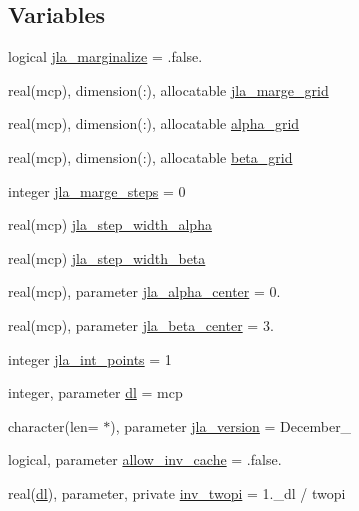 \subsection*{Variables}
\begin{DoxyCompactItemize}
\item 
logical \mbox{\hyperlink{namespacejla_af9daaf320a7953866d9f29f7f569fbe4}{jla\+\_\+marginalize}} = .false.
\item 
real(mcp), dimension(\+:), allocatable \mbox{\hyperlink{namespacejla_a9dc22edc44b8361f9204d217df48cd90}{jla\+\_\+marge\+\_\+grid}}
\item 
real(mcp), dimension(\+:), allocatable \mbox{\hyperlink{namespacejla_a1b7511f05dabf960a434da4444f44b88}{alpha\+\_\+grid}}
\item 
real(mcp), dimension(\+:), allocatable \mbox{\hyperlink{namespacejla_a105d58f143e8da2dc75625cfaeed54e7}{beta\+\_\+grid}}
\item 
integer \mbox{\hyperlink{namespacejla_abdf521613e95b6b0873dc07e2182f08c}{jla\+\_\+marge\+\_\+steps}} = 0
\item 
real(mcp) \mbox{\hyperlink{namespacejla_a1b8ab5c356e2c83f267f757196a4a1d2}{jla\+\_\+step\+\_\+width\+\_\+alpha}}
\item 
real(mcp) \mbox{\hyperlink{namespacejla_adbfc26690b5ccc65be262cc876cb3bc0}{jla\+\_\+step\+\_\+width\+\_\+beta}}
\item 
real(mcp), parameter \mbox{\hyperlink{namespacejla_a4556268c3d45127055caae2fcea446fc}{jla\+\_\+alpha\+\_\+center}} = 0.
\item 
real(mcp), parameter \mbox{\hyperlink{namespacejla_a9a9c2c6948ab744eed4e350dad8715bc}{jla\+\_\+beta\+\_\+center}} = 3.
\item 
integer \mbox{\hyperlink{namespacejla_a11ab12ec846d481127e505fb14a88ab3}{jla\+\_\+int\+\_\+points}} = 1
\item 
integer, parameter \mbox{\hyperlink{namespacejla_a3aa6435b4e08f1d532390186ac608741}{dl}} = mcp
\item 
character(len= $\ast$), parameter \mbox{\hyperlink{namespacejla_a9facfef6576a64d9e5b180caec42ea7d}{jla\+\_\+version}} = \textquotesingle{}December\+\_\textquotesingle{}
\item 
logical, parameter \mbox{\hyperlink{namespacejla_a5032684691d0e984e5aa1cbdc55795f7}{allow\+\_\+inv\+\_\+cache}} = .false.
\item 
real(\mbox{\hyperlink{namespacejla_a3aa6435b4e08f1d532390186ac608741}{dl}}), parameter, private \mbox{\hyperlink{namespacejla_a3f2ed7b8048c2f4dd93374020335944f}{inv\+\_\+twopi}} = 1.\+\_\+dl / twopi

\end{DoxyCompactItemize}
